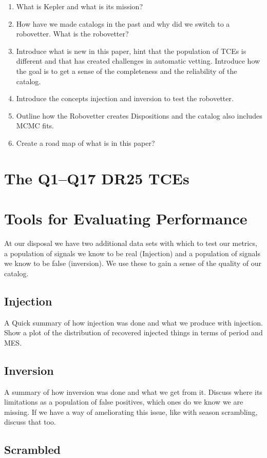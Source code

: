 \documentclass[onecolumn]{aastex6}
\begin{document}
\begin{enumerate}
\item What is Kepler and what is its mission?
\item How have we made catalogs in the past and why did we switch to a robovetter. What is the robovetter?
\item Introduce what is new in this paper, hint that the population of TCEs is different and that has created challenges in automatic vetting. Introduce how the goal is to get a sense of the completeness and the reliability of the catalog.
\item Introduce the concepts injection and inversion to test the robovetter.
\item Outline how the Robovetter creates Dispositions and the catalog also includes MCMC fits.
\item Create a road map of what is in this paper?
\end{enumerate}

\section{The Q1--Q17 DR25 TCEs}



\section{Tools for Evaluating Performance}
 At our disposal we have two additional data sets with which to test our metrics, a population of signals we know to be real (Injection) and a population of signals we know to be false (inversion). We use these to gain a sense of the quality of our catalog.
\subsection{Injection} 
\label{s:inj}
A Quick summary of how injection was done and what we produce with injection. Show a plot of the distribution of recovered injected things in terms of period and MES.
\subsection{Inversion}
\label{s:inv} 
A summary of how inversion was done and what we get from it. Discuss where its limitations as a population of false positives, which ones do we know we are missing. If we have a way of ameliorating this issue, like with season scrambling, discuss that too.
\subsection{Scrambled}
\label{s:scr}
\end{document}
